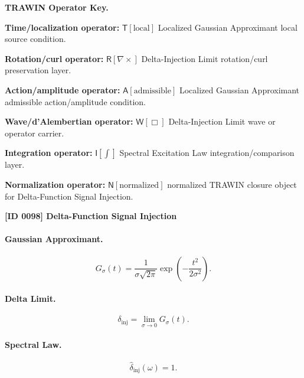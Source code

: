 \par\vspace{0.45\baselineskip}
\noindent\begin{minipage}[t]{\linewidth}
\begingroup
\small
\raggedright
\textbf{TRAWIN Operator Key.}\par
\noindent\textbf{Time/localization operator:} $\mathsf{T}\!\left[\mathrm{local}\right]$ Localized Gaussian Approximant local source condition.\par
\noindent\textbf{Rotation/curl operator:} $\mathsf{R}\!\left[\nabla\times\right]$ Delta-Injection Limit rotation/curl preservation layer.\par
\noindent\textbf{Action/amplitude operator:} $\mathsf{A}\!\left[\mathrm{admissible}\right]$ Localized Gaussian Approximant admissible action/amplitude condition.\par
\noindent\textbf{Wave/d'Alembertian operator:} $\mathsf{W}\!\left[\Box\right]$ Delta-Injection Limit wave or operator carrier.\par
\noindent\textbf{Integration operator:} $\mathsf{I}\!\left[\int\right]$ Spectral Excitation Law integration/comparison layer.\par
\noindent\textbf{Normalization operator:} $\mathsf{N}\!\left[\mathrm{normalized}\right]$ normalized TRAWIN closure object for Delta-Function Signal Injection.\par
\endgroup
\end{minipage}

\clearpage
\noindent\textbf{[ID 0098] Delta-Function Signal Injection}\par
\vspace{0.35em}
\paragraph{Gaussian Approximant.}
\begin{equation}
G_{\sigma}(t)
=
\frac{1}{\sigma\sqrt{2\pi}}
\exp\left(
-\frac{t^2}{2\sigma^2}
\right).
\end{equation}

\paragraph{Delta Limit.}
\begin{equation}
\delta_{\mathrm{inj}}
=
\lim_{\sigma\to0}G_{\sigma}(t).
\end{equation}

\paragraph{Spectral Law.}
\begin{equation}
\widehat{\delta}_{\mathrm{inj}}(\omega)=1.
\end{equation}

